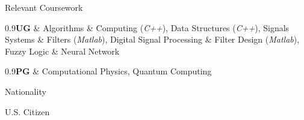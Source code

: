 \begin{Section}{Relevant Coursework}

	\begin{nbList}

		\item \begin{specTable}{0.9}\textbf{UG} & Algorithms \& Computing (\textit{C++}), Data Structures (\textit{C++}), Signals Systems \& Filters (\textit{Matlab}), Digital Signal Processing \& Filter Design (\textit{Matlab}), Fuzzy Logic \& Neural Network\end{specTable}

		\item \begin{specTable}{0.9}\textbf{PG} & Computational Physics, Quantum Computing \end{specTable}


	\end{nbList}

\end{Section}


\begin{Section}{Nationality}

	\begin{hindent}

		U.S. Citizen

	\end{hindent}

\end{Section}



